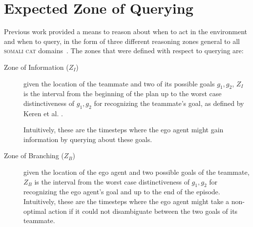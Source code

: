 \documentclass[letterpaper]{article}
\begin{document}
\section{Expected Zone of Querying}
Previous work provided a means to reason about when to act in the environment and when to query, in the form of three different reasoning zones general to all \textsc{somali cat} domains~\cite{mirskypenny}. The zones that were defined with respect to querying are: %
\begin{description}
\item [Zone of Information ($Z_I$)] given the location of the teammate and two of its possible goals $g_1,g_2$, $Z_I$ is the interval from the beginning of the plan up to the worst case distinctiveness of $g_1,g_2$ for recognizing the teammate's goal, as defined by Keren et al. .



Intuitively, these are the timesteps where the ego agent might gain information by querying about these goals.

\item [Zone of Branching ($Z_B$)] given the location of the ego agent and two possible goals of the teammate, $Z_B$ is the interval from the worst case distinctiveness of $g_1,g_2$ for recognizing the ego agent's goal and up to the end of the episode.
Intuitively, these are the timesteps where the ego agent might take a non-optimal action if it could not disambiguate between the two goals of its teammate.



\end{description}
\end{document}
